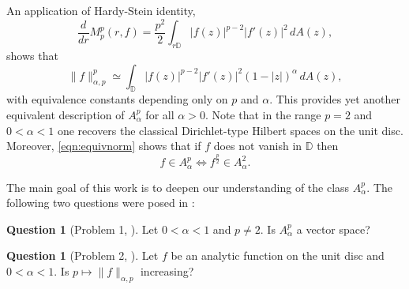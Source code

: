 \documentclass[12pt]{amsart}
\theoremstyle{definition}
\newtheorem{question}[theorem]{Question}
\newcommand{\D}{\mathbb{{D}}}
\numberwithin{equation}{section}
\begin{document}
        An application of Hardy-Stein identity,
            \[
                \dfrac{d}{dr} M_p^p (r,f) = \dfrac{p^2}{2} \int_{r\D} |f(z)|^{p-2} |f'(z)|^2 \, dA(z),
            \]
            shows that 
            \begin{equation}
            \label{eqn:equivnorm}
            \|f\|_{\alpha, p}^p\simeq\int_{\D} |f(z)|^{p-2} |f'(z)|^2 (1 - |z|)^{\alpha} \, dA(z),
            \end{equation}
            with equivalence constants depending only on $p$ and $\alpha$.
            This provides yet another equivalent description of $A^p_\alpha$ for all $\alpha>0$. Note that in the range $p=2$ and $0<\alpha<1$ one recovers the  classical Dirichlet-type Hilbert spaces on the unit disc. Moreover, \eqref{eqn:equivnorm} shows that if $f$ does not vanish in $\D$ then
            \begin{equation}
                \label{eqn:nonvanishing}
                f\in A^p_\alpha\iff f^\frac{p}{2}\in A^2_\alpha.
            \end{equation}
            
        The main goal of this work is to deepen our understanding of the class $A^p_\alpha$. The following two questions were posed in \cite{brevig2025contractivehardylittlewoodinequalitiesdirichlet}:
        
        \begin{question}[Problem 1, \cite{brevig2025contractivehardylittlewoodinequalitiesdirichlet}]
        \label{q:linear}
            Let $0<\alpha<1$ and $p \neq 2$. Is $A^p_\alpha$ a vector space?
        \end{question}
        
        \begin{question}[Problem 2, \cite{brevig2025contractivehardylittlewoodinequalitiesdirichlet}]
        \label{q:increasing}
            Let $f$ be an analytic function on the unit disc and $0<\alpha<1$. Is $p\mapsto \|f\|_{\alpha, p}$ increasing?
        \end{question}
            
\end{document}

